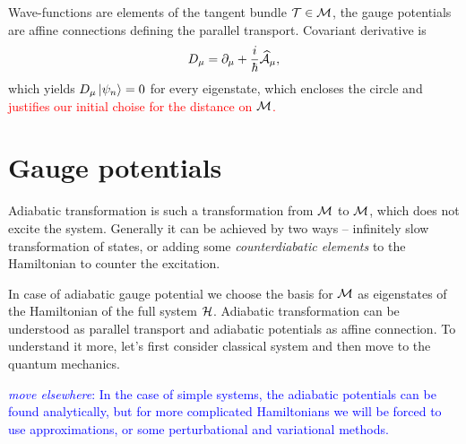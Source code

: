 Wave-functions are elements of the tangent bundle $\TT\in \M$, the gauge potentials are affine connections defining the parallel transport. Covariant derivative is
\begin{equation}
    D_\mu=\partial_\mu+\frac{i}{\hbar}\AA_\mu,
\end{equation}
which yields $D_\mu\ket{\psi_n}=0$ for every eigenstate, which encloses the circle and \textcolor{red}{justifies our initial choise for the distance on $\M$.}








\section{Gauge potentials}
Adiabatic transformation is such a transformation from $\M$ to $\M$, which does not excite the system. Generally it can be achieved by two ways -- infinitely slow transformation of states, or adding some \emph{counterdiabatic elements} to the Hamiltonian to counter the excitation.


In case of adiabatic gauge potential we choose the basis for $\M$ as eigenstates of the Hamiltonian of the full system $\H$. Adiabatic transformation can be understood as parallel transport and adiabatic potentials as affine connection. To understand it more, let's first consider classical system and then move to the quantum mechanics.


\textcolor{blue}{\emph{move elsewhere}: In the case of simple systems, the adiabatic potentials can be found analytically, but for more complicated Hamiltonians we will be forced to use approximations, or some perturbational and variational methods.}




